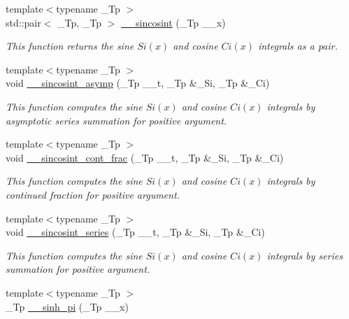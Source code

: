 \begin{DoxyCompactItemize}
\item 
{\footnotesize template$<$typename \+\_\+\+Tp $>$ }\\std\+::pair$<$ \+\_\+\+Tp, \+\_\+\+Tp $>$ \hyperlink{namespacestd_1_1____detail_a53bf807a99eef68cdb6f917c7ca085bf}{\+\_\+\+\_\+sincosint} (\+\_\+\+Tp \+\_\+\+\_\+x)
\begin{DoxyCompactList}\small\item\em This function returns the sine $ Si(x) $ and cosine $ Ci(x) $ integrals as a {\ttfamily pair}. \end{DoxyCompactList}\item 
{\footnotesize template$<$typename \+\_\+\+Tp $>$ }\\void \hyperlink{namespacestd_1_1____detail_a976c3ff52c54001de3d409900c9bcb9c}{\+\_\+\+\_\+sincosint\+\_\+asymp} (\+\_\+\+Tp \+\_\+\+\_\+t, \+\_\+\+Tp \&\+\_\+\+Si, \+\_\+\+Tp \&\+\_\+\+Ci)
\begin{DoxyCompactList}\small\item\em This function computes the sine $ Si(x) $ and cosine $ Ci(x) $ integrals by asymptotic series summation for positive argument. \end{DoxyCompactList}\item 
{\footnotesize template$<$typename \+\_\+\+Tp $>$ }\\void \hyperlink{namespacestd_1_1____detail_a211f552bca2944f64e3a1f5593690fda}{\+\_\+\+\_\+sincosint\+\_\+cont\+\_\+frac} (\+\_\+\+Tp \+\_\+\+\_\+t, \+\_\+\+Tp \&\+\_\+\+Si, \+\_\+\+Tp \&\+\_\+\+Ci)
\begin{DoxyCompactList}\small\item\em This function computes the sine $ Si(x) $ and cosine $ Ci(x) $ integrals by continued fraction for positive argument. \end{DoxyCompactList}\item 
{\footnotesize template$<$typename \+\_\+\+Tp $>$ }\\void \hyperlink{namespacestd_1_1____detail_aea85e0044476065ed4a067f1aa9647cb}{\+\_\+\+\_\+sincosint\+\_\+series} (\+\_\+\+Tp \+\_\+\+\_\+t, \+\_\+\+Tp \&\+\_\+\+Si, \+\_\+\+Tp \&\+\_\+\+Ci)
\begin{DoxyCompactList}\small\item\em This function computes the sine $ Si(x) $ and cosine $ Ci(x) $ integrals by series summation for positive argument. \end{DoxyCompactList}\item 
{\footnotesize template$<$typename \+\_\+\+Tp $>$ }\\\+\_\+\+Tp \hyperlink{namespacestd_1_1____detail_a6dd7153012cc7885e76a47a5162981da}{\+\_\+\+\_\+sinh\+\_\+pi} (\+\_\+\+Tp \+\_\+\+\_\+x)

\end{DoxyCompactItemize}
